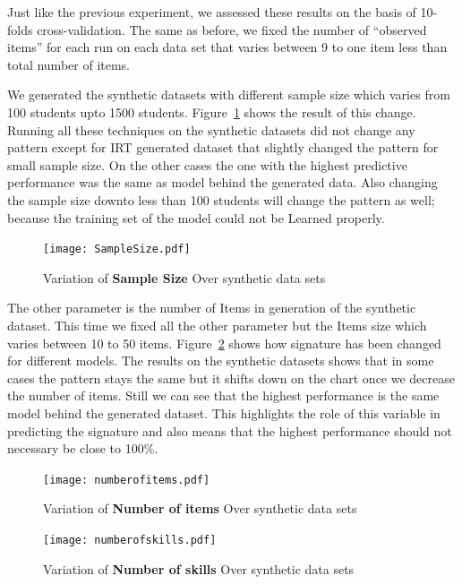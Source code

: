 Just like the previous experiment, we assessed these results on the basis of 10-folds cross-validation. The same as before, we fixed the number of ``observed items'' for each run on each data set that varies between 9 to one item less than total number of items.

We generated the synthetic datasets with different sample size which varies from 100 students upto 1500 students. Figure~\ref{figSampleSize} shows the result of this change. Running all these techniques on the synthetic datasets did not change any pattern except for IRT generated dataset that slightly changed the pattern for small sample size. On the other cases the one with the highest predictive performance was the same as model behind the generated data. Also changing the sample size downto less than 100 students will change the pattern as well; because the training set of the model could not be Learned properly.


\begin{figure}
  \centering

    \texttt{[image: SampleSize.pdf]}
     \caption{Variation of \textbf{Sample Size} Over synthetic data sets}
\label{figSampleSize}
\end{figure}

The other parameter is the number of Items in generation of the synthetic dataset. This time we fixed all the other parameter but the Items size which varies between 10 to 50 items. Figure~\ref{figNumberofItems} shows how signature has been changed for different models. The results on the synthetic datasets shows that in some cases the pattern stays the same but it shifts down on the chart once we decrease the number of items. Still we can see that the highest performance is the same model behind the generated dataset. This highlights the role of this variable in predicting the signature and also means that the highest performance should not necessary be close to 100\%.

\begin{figure}
  \centering
    \texttt{[image: numberofitems.pdf]}
\caption{Variation of \textbf{Number of items} Over synthetic data sets}
\label{figNumberofItems}
\end{figure}

\begin{figure}
  \centering
    \texttt{[image: numberofskills.pdf]}
\caption{Variation of \textbf{Number of skills} Over synthetic data sets}
\label{figSkills}
\end{figure}

